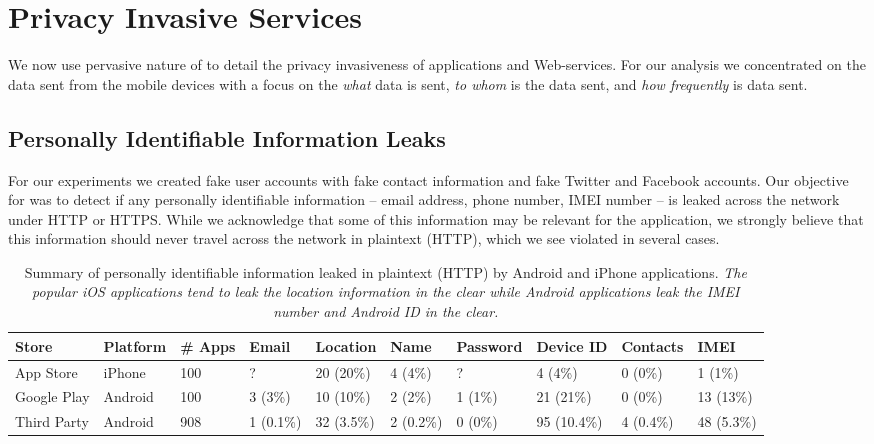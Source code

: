 \section{Privacy Invasive Services}
\label{sec:characterize-app}

We now use pervasive nature of \platname to detail  the privacy invasiveness of applications and Web-services. 
For our analysis we concentrated on the data sent from the mobile devices with a focus on the {\it what} data is sent,  {\it to whom} is the data sent, and {\it how frequently} is data sent.

\subsection{Personally Identifiable Information Leaks}

For our experiments we created fake user accounts with fake contact information and fake Twitter and Facebook accounts.  
Our objective for was to detect if any personally identifiable information -- email address, phone number, IMEI number -- is leaked across the network under HTTP or HTTPS.  
While we acknowledge that some of this information may be relevant for the application, we strongly believe that this information should never travel across the network in plaintext (HTTP), which we see violated in several cases.


\begin{table*}[t]    
    \centering
    \begin{small}
    \begin{tabular}{|l|l|l|l|l|l|l|l|l|l|}
       \hline
       {\bf Store}&{\bf Platform}&{\bf \# Apps}&{\bf Email}& {\bf Location}& {\bf Name} &{\bf Password}& {\bf Device ID}& {\bf Contacts}& {\bf IMEI}\\
       \hline
       App Store&iPhone&100&?&20 (20\%)&4 (4\%)&?&4 (4\%)&0 (0\%)&1 (1\%)\\
       \hline
       Google Play&Android&100&3 (3\%)&10 (10\%)&2 (2\%)&1 (1\%)&21 (21\%)&0 (0\%)&13 (13\%)\\
       \hline
       Third Party&Android&908&1 (0.1\%)&32 (3.5\%)&2 (0.2\%)&0 (0\%)&95 (10.4\%)&4 (0.4\%)&48 (5.3\%)\\
       \hline
    \end{tabular}
    \end{small}
    \caption{Summary of personally identifiable information leaked in plaintext (HTTP) by Android and iPhone applications. \emph{The popular iOS applications tend to leak the location information in the clear while Android applications leak the IMEI number and Android ID in the clear.}}
    \label{tbl:pii}
\end{table*}

